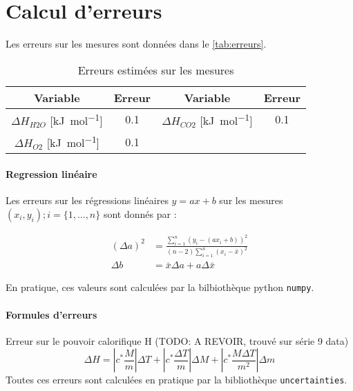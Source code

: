 \section{Calcul d'erreurs}
\label{sec:erreurs}

Les erreurs sur les mesures sont données dans le \autoref{tab:erreurs}.

\begin{table}[h]
    \centering
    \begin{tabulary}{\textwidth}{C C|C C}
        \toprule
        Variable & Erreur & Variable & Erreur \\
        \midrule
        \(\Delta H_{H2O}\) [\si{\kilo\joule\per\mole}] & 0.1 & \(\Delta H_{CO2}\) [\si{\kilo\joule\per\mole}] & 0.1 \\
        \(\Delta H_{O2}\) [\si{\kilo\joule\per\mole}] & 0.1 & & \\
        \bottomrule
    \end{tabulary}
    \caption{Erreurs estimées sur les mesures}
    \label{tab:erreurs}
\end{table}

\paragraph*{Regression linéaire}
Les erreurs sur les régressions linéaires \(y = ax + b\) sur les mesures \((x_i, y_i) ; i = \{1, \hdots, n\}\) sont donnés par \cite{erreursmesure}:

\begin{equation}
    \label{eq:erreur:fit}
    \begin{aligned}
        (\Delta a)^2 &= \frac{\sum_{i=1}^{n}(y_i - (a x_i + b))^2}{(n-2) \sum_{i=1}^{n}(x_i - \bar{x})^2}\\
        \Delta b &= \bar{x} \Delta a + a \Delta \bar{x}
    \end{aligned}
\end{equation}

En pratique, ces valeurs sont calculées par la bilbiothèque python \texttt{numpy}.

\paragraph*{Formules d'erreurs}

Erreur sur le pouvoir calorifique H (TODO: A REVOIR, trouvé sur série 9 data)
\begin{equation}
    \Delta H = \left|c^* \frac{M}{{m}}\right| \Delta T + \left| c^* \frac{{\Delta T}}{{m}}\right| \Delta M + \left| c^* \frac{M \Delta T}{m^2}\right| \Delta m
\end{equation}
Toutes ces erreurs sont calculées en pratique par la bibliothèque \texttt{uncertainties}.
